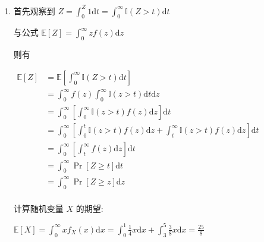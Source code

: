 \documentclass[answers]{exam}  %
\begin{document}
\begin{questions}
\begin{solution}
\begin{enumerate}
      \item 首先观察到 $\displaystyle Z = \int_{0}^{Z} 1 \mathrm{d}t = \int_{0}^{\infty} \mathbb{I}(Z > t) \mathrm{d}t$

            与公式 $\displaystyle \mathbb{E}[Z] = \int_{0}^{\infty} zf(z) \mathrm{d}z$

            则有

            $
              \begin{aligned}
                \mathbb{E}[Z] & = \displaystyle \mathbb{E}[\int_{0}^{\infty} \mathbb{I}(Z > t) \mathrm{d}t]                                                                          \\
                              & = \displaystyle \int_{0}^{\infty} f(z)\int_{0}^{\infty} \mathbb{I}(z > t) \mathrm{d}t \mathrm{d}z                                                    \\
                              & = \displaystyle \int_{0}^{\infty} [\int_{0}^{\infty} \mathbb{I}(z > t)f(z) \mathrm{d}z] \mathrm{d}t                                                  \\
                              & = \displaystyle \int_{0}^{\infty} [\int_{0}^{t} \mathbb{I}(z > t)f(z) \mathrm{d}z + \int_{t}^{\infty} \mathbb{I}(z > t)f(z) \mathrm{d}z] \mathrm{d}t \\
                              & = \displaystyle \int_{0}^{\infty} [\int_{t}^{\infty} f(z) \mathrm{d}z] \mathrm{d}t                                                                   \\
                              & = \int_{0}^{\infty} \operatorname{Pr}[Z \ge t] \mathrm{d}t                                                                                           \\
                              & = \int_{0}^{\infty} \operatorname{Pr}[Z \ge z] \mathrm{d}z                                                                                           \\
              \end{aligned}
            $

            计算随机变量 $X$ 的期望:

            $\displaystyle \mathbb{E}[X] = \int_{0}^{\infty} xf_{X}(x) \mathrm{d}x = \int_{0}^{1} \frac{1}{4} x\mathrm{d}x + \int_{3}^{5} \frac{3}{8} x\mathrm{d}x = \frac{25}{8}$


\end{enumerate}
\end{solution}
\end{questions}
\end{document}
